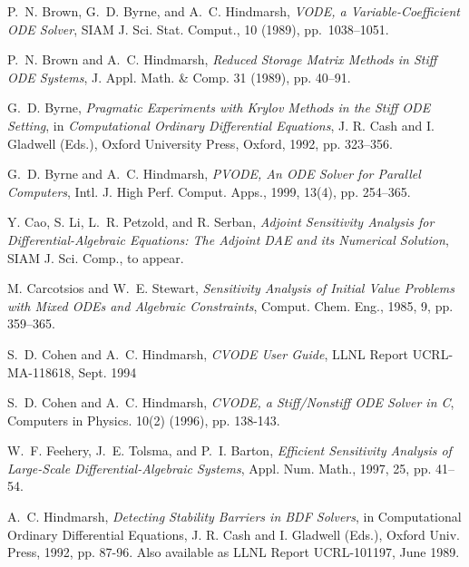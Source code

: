 
\begin{thebibliography}{99}

{P.~N. Brown, G.~D. Byrne, and A.~C. Hindmarsh}, {\em {VODE}, a
Variable-Coefficient {ODE} Solver}, SIAM J. Sci. Stat. Comput., 10 (1989),
pp.~1038--1051.

P.~N. Brown and A.~C. Hindmarsh, {\em Reduced Storage Matrix Methods
in Stiff ODE Systems}, J. Appl. Math. \& Comp. 31 (1989), pp. 40--91.

G.~D. Byrne, {\em Pragmatic Experiments with Krylov Methods in
the Stiff ODE Setting}, in {\em Computational Ordinary Differential
Equations}, J. R. Cash and I. Gladwell (Eds.), Oxford University
Press, Oxford, 1992, pp. 323--356.


G.~D. Byrne and A.~C. Hindmarsh, {\em PVODE, An ODE Solver for Parallel Computers}, 
Intl. J. High Perf. Comput. Apps., 1999, 13(4), pp. 254--365.

Y. Cao, S. Li, L.~R. Petzold, and R. Serban,
{\em Adjoint Sensitivity Analysis for Differential-Algebraic
Equations: The Adjoint DAE and its Numerical Solution},
SIAM J. Sci. Comp., to appear.

M. Carcotsios and W.~E. Stewart, {\em Sensitivity Analysis of Initial Value
Problems with Mixed ODEs and Algebraic Constraints}, Comput. Chem. Eng., 1985,
9, pp. 359--365.

S.~D. Cohen and A.~C. Hindmarsh, {\em CVODE User Guide},
LLNL Report UCRL-MA-118618, Sept. 1994

S.~D. Cohen and A.~C. Hindmarsh, {\em CVODE, a Stiff/Nonstiff ODE Solver in C},
Computers in Physics. 10(2) (1996), pp. 138-143.

W.~F. Feehery, J.~E. Tolsma, and P.~I. Barton, {\em Efficient Sensitivity
Analysis of Large-Scale Differential-Algebraic Systems}, Appl. Num. Math., 1997, 25, 
pp. 41--54.

A.~C. Hindmarsh, {\em Detecting Stability Barriers in BDF Solvers},
in Computational Ordinary Differential Equations, J. R. Cash and
I. Gladwell (Eds.), Oxford Univ. Press, 1992, pp. 87-96.  Also
available as LLNL Report UCRL-101197, June 1989.


\end{thebibliography}
